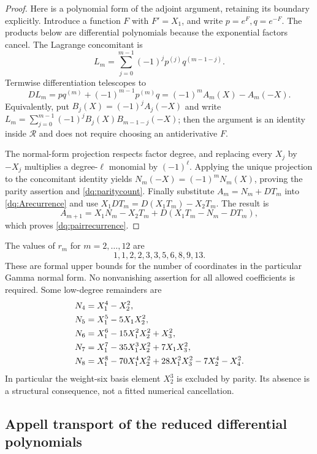 \begin{proof}
Here is a polynomial form of the adjoint argument, retaining its
boundary explicitly. Introduce a function $F$ with $F'=X_1$, and
write $p=e^F,q=e^{-F}$. The products below are differential
polynomials because the exponential factors cancel. The Lagrange
concomitant is
\[
 L_m=\sum_{j=0}^{m-1}(-1)^j p^{(j)}q^{(m-1-j)}.
\]
Termwise differentiation telescopes to
\[
 DL_m=pq^{(m)}+(-1)^{m-1}p^{(m)}q
       =(-1)^m A_m(X)-A_m(-X).
\]
Equivalently, put $B_j(X)=(-1)^jA_j(-X)$ and write
$L_m=\sum_{j=0}^{m-1}(-1)^jB_j(X)B_{m-1-j}(-X)$;
then the argument is an identity inside $\mathscr R$ and does not
require choosing an antiderivative $F$.

The normal-form projection respects factor degree, and replacing every
$X_j$ by $-X_j$ multiplies a degree-$\ell$ monomial by $(-1)^\ell$.
Applying the unique projection to the concomitant identity yields
$N_m(-X)=(-1)^mN_m(X)$, proving the parity assertion and
\eqref{dq:paritycount}. Finally substitute $A_m=N_m+DT_m$ into
\eqref{dq:Arecurrence} and use
$X_1DT_m=D(X_1T_m)-X_2T_m$. The result is
\[
 A_{m+1}=X_1N_m-X_2T_m+D(X_1T_m-N_m-DT_m),
\]
which proves \eqref{dq:pairrecurrence}.
\end{proof}

The values of $r_m$ for $m=2,\ldots,12$ are
\[
 1,1,2,2,3,3,5,6,8,9,13.
\]
These are formal upper bounds for the number of coordinates in
the particular Gamma normal form. No nonvanishing assertion for all
allowed coefficients is required. Some low-degree remainders are
\begin{align}
 N_4&=X_1^4-X_2^2,\notag\\
 N_5&=X_1^5-5X_1X_2^2,\notag\\
 N_6&=X_1^6-15X_1^2X_2^2+X_3^2,\label{dq:N4567}\\
 N_7&=X_1^7-35X_1^3X_2^2+7X_1X_3^2,\notag\\
 N_8&=X_1^8-70X_1^4X_2^2+28X_1^2X_3^2-7X_2^4-X_4^2.
 \notag
\end{align}
In particular the weight-six basis element $X_2^3$ is excluded by
parity. Its absence is a structural consequence, not a fitted numerical
cancellation.

\subsection{Appell transport of the reduced differential polynomials}

